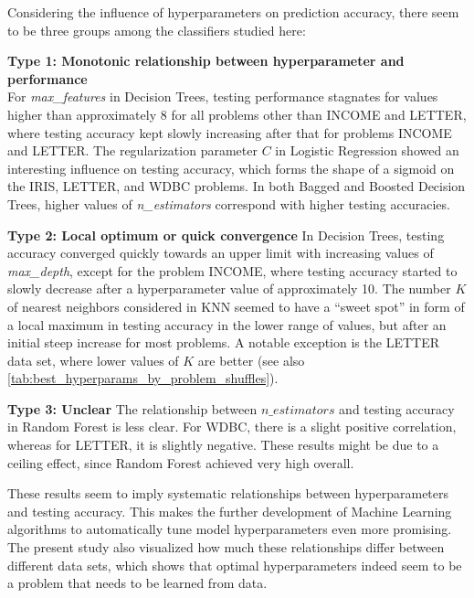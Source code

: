 \documentclass[twoside,11pt]{article}
\begin{document}
		Considering the influence of hyperparameters on prediction accuracy, there seem to be three groups among the classifiers studied here:
		
		\noindent\textbf{Type 1: Monotonic relationship between hyperparameter and performance}\\
		For \textit{max\_features} in Decision Trees, testing performance stagnates for values higher than approximately 8 for all problems other than INCOME and LETTER, where testing accuracy kept slowly increasing after that for problems INCOME and LETTER. The regularization parameter $C$ in Logistic Regression showed an interesting influence on testing accuracy, which forms the shape of a sigmoid on the IRIS, LETTER, and WDBC problems. In both Bagged and Boosted Decision Trees, higher values of \textit{n\_estimators} correspond with higher testing accuracies.
		
		\noindent\textbf{Type 2: Local optimum or quick convergence}
		In Decision Trees, testing accuracy converged quickly towards an upper limit with increasing values of \textit{max\_depth}, except for the problem INCOME, where testing accuracy started to slowly decrease after a hyperparameter value of approximately 10. The number $K$ of nearest neighbors considered in KNN seemed to have a ``sweet spot'' in form of a local maximum in testing accuracy in the lower range of values, but after an initial steep increase for most problems. A notable exception is the LETTER data set, where lower values of $K$ are better (see also \ref{tab:best_hyperparams_by_problem_shuffles}).
		
		\noindent\textbf{Type 3: Unclear}
		The relationship between $n\_estimators$ and testing accuracy in Random Forest is less clear. For WDBC, there is a slight positive correlation, whereas for LETTER, it is slightly negative. These results might be due to a ceiling effect, since Random Forest achieved very high overall.
		
		These results seem to imply systematic relationships between hyperparameters and testing accuracy. This makes the further development of Machine Learning algorithms to automatically tune model hyperparameters even more promising. The present study also visualized how much these relationships differ between different data sets, which shows that optimal hyperparameters indeed seem to be a problem that needs to be learned from data.
	
\end{document}
